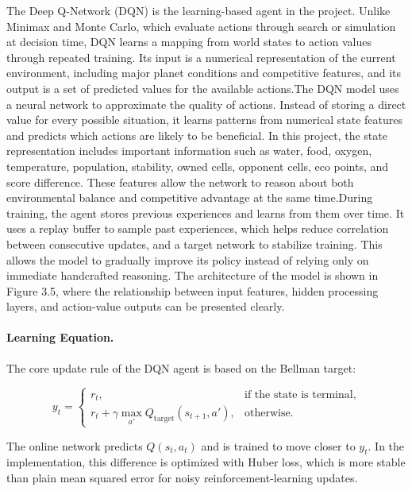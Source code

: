 \documentclass[12pt,a4paper]{article}
\begin{document}
The Deep Q-Network (DQN) is the learning-based agent in the project. Unlike Minimax and Monte Carlo, which evaluate actions through search or simulation at decision time, DQN learns a mapping from world states to action values through repeated training. Its input is a numerical representation of the current environment, including major planet conditions and competitive features, and its output is a set of predicted values for the available actions.The DQN model uses a neural network to approximate the quality of actions. Instead of storing a direct value for every possible situation, it learns patterns from numerical state features and predicts which actions are likely to be beneficial. In this project, the state representation includes important information such as water, food, oxygen, temperature, population, stability, owned cells, opponent cells, eco points, and score difference. These features allow the network to reason about both environmental balance and competitive advantage at the same time.During training, the agent stores previous experiences and learns from them over time. It uses a replay buffer to sample past experiences, which helps reduce correlation between consecutive updates, and a target network to stabilize training. This allows the model to gradually improve its policy instead of relying only on immediate handcrafted reasoning. The architecture of the model is shown in Figure 3.5, where the relationship between input features, hidden processing layers, and action-value outputs can be presented clearly.

\paragraph{Learning Equation.}
The core update rule of the DQN agent is based on the Bellman target:

\begin{equation}
y_t =
\begin{cases}
r_t, & \text{if the state is terminal,} \\
r_t + \gamma \max_{a'} Q_{\text{target}}(s_{t+1}, a'), & \text{otherwise.}
\end{cases}
\end{equation}

The online network predicts $Q(s_t,a_t)$ and is trained to move closer to $y_t$. In the implementation, this difference is optimized with Huber loss, which is more stable than plain mean squared error for noisy reinforcement-learning updates.
\end{document}
